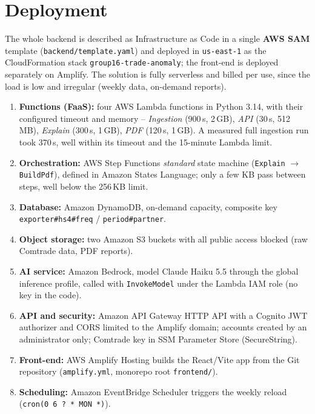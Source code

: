 \documentclass[10pt,a4paper]{article}
\begin{document}
\section*{Deployment}
The whole backend is described as Infrastructure as Code in a single \textbf{AWS SAM} template (\texttt{backend/template.yaml}) and deployed in \texttt{us-east-1} as the CloudFormation stack \texttt{group16-trade-anomaly}; the front-end is deployed separately on Amplify. The solution is fully serverless and billed per use, since the load is low and irregular (weekly data, on-demand reports).
\begin{enumerate}
  \item \textbf{Functions (FaaS):} four AWS Lambda functions in Python 3.14, with their configured timeout and memory -- \textit{Ingestion} (900\,s, 2\,GB), \textit{API} (30\,s, 512\,MB), \textit{Explain} (300\,s, 1\,GB), \textit{PDF} (120\,s, 1\,GB). A measured full ingestion run took 370\,s, well within its timeout and the 15-minute Lambda limit.
  \item \textbf{Orchestration:} AWS Step Functions \emph{standard} state machine (\texttt{Explain} $\rightarrow$ \texttt{BuildPdf}), defined in Amazon States Language; only a few KB pass between steps, well below the 256\,KB limit.
  \item \textbf{Database:} Amazon DynamoDB, on-demand capacity, composite key \texttt{exporter\#hs4\#freq} / \texttt{period\#partner}.
  \item \textbf{Object storage:} two Amazon S3 buckets with all public access blocked (raw Comtrade data, PDF reports).
  \item \textbf{AI service:} Amazon Bedrock, model Claude Haiku 5.5 through the global inference profile, called with \texttt{InvokeModel} under the Lambda IAM role (no key in the code).
  \item \textbf{API and security:} Amazon API Gateway HTTP API with a Cognito JWT authorizer and CORS limited to the Amplify domain; accounts created by an administrator only; Comtrade key in SSM Parameter Store (SecureString).
  \item \textbf{Front-end:} AWS Amplify Hosting builds the React/Vite app from the Git repository (\texttt{amplify.yml}, monorepo root \texttt{frontend/}).
  \item \textbf{Scheduling:} Amazon EventBridge Scheduler triggers the weekly reload (\texttt{cron(0 6 ? * MON *)}).
\end{enumerate}

\end{document}
